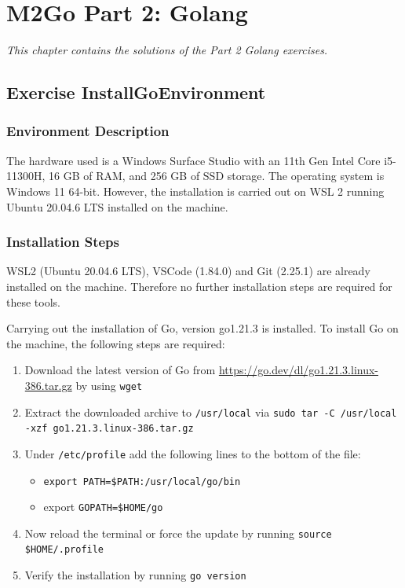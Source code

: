\chapter{M2Go Part 2: Golang}
\label{cha:golang}
\textit{This chapter contains the solutions of the Part 2 Golang exercises.}

\section{Exercise InstallGoEnvironment}

\subsection{Environment Description}
The hardware used is a Windows Surface Studio with an 11th Gen Intel Core i5-11300H, 16 GB of RAM, and 256 GB of SSD storage.
The operating system is Windows 11 64-bit. However, the installation is carried out on WSL 2 running Ubuntu 20.04.6 LTS installed on the machine.

\subsection{Installation Steps}
WSL2 (Ubuntu 20.04.6 LTS), VSCode (1.84.0) and Git (2.25.1) are already installed on the machine. Therefore no further installation steps are required for these tools.

Carrying out the installation of Go, version go1.21.3 is installed.
To install Go on the machine, the following steps are required:
\begin{enumerate}
    \item Download the latest version of Go from \url{https://go.dev/dl/go1.21.3.linux-386.tar.gz} by using  \texttt{wget}
    \item Extract the downloaded archive to \texttt{/usr/local} via \texttt{sudo tar -C /usr/local -xzf go1.21.3.linux-386.tar.gz}
    \item Under \texttt{/etc/profile} add the following lines to the bottom of the file: 
    \begin{itemize}
        \item \texttt{export PATH=\$PATH:/usr/local/go/bin}
        \item export \texttt{GOPATH=\$HOME/go}
    \end{itemize}
    \item Now reload the terminal or force the update by running \texttt{source \$HOME/.profile}
    \item Verify the installation by running \texttt{go version}
\end{enumerate}

